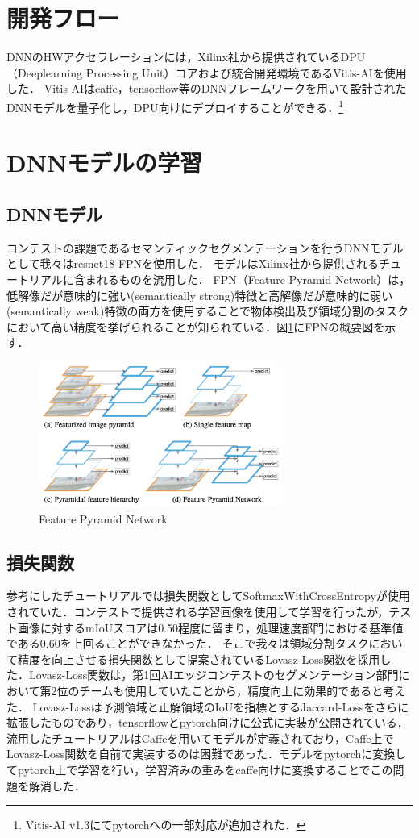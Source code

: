 \section{開発フロー}
DNNのHWアクセラレーションには，Xilinx社から提供されているDPU（Deeplearning Processing Unit）コア\cite{dpuip}および統合開発環境であるVitis-AIを使用した．
Vitis-AIはcaffe，tensorflow等のDNNフレームワークを用いて設計されたDNNモデルを量子化し，DPU向けにデプロイすることができる．\footnote{Vitis-AI v1.3にてpytorchへの一部対応が追加された．}
\section{DNNモデルの学習}
\subsection{DNNモデル}
コンテストの課題であるセマンティックセグメンテーションを行うDNNモデルとして我々はresnet18-FPNを使用した．
モデルはXilinx社から提供されるチュートリアル\cite{tutorial}に含まれるものを流用した．
FPN（Feature Pyramid Network）\cite{fpn}は，低解像だが意味的に強い(semantically strong)特徴と高解像だが意味的に弱い(semantically weak)特徴の両方を使用することで物体検出及び領域分割のタスクにおいて高い精度を挙げられることが知られている．図\ref{figure_fpn}にFPNの概要図を示す．
\begin{figure}[h]
    \begin{center}
        \includegraphics[width=8.0cm]{figures/fpn.png}
        \caption{Feature Pyramid Network\cite{fpn}}
        \label{figure_fpn}
        \end{center}
\end{figure}
\subsection{損失関数}
参考にしたチュートリアルでは損失関数としてSoftmaxWithCrossEntropyが使用されていた．コンテストで提供される学習画像を使用して学習を行ったが，テスト画像に対するmIoUスコアは0.50程度に留まり，処理速度部門における基準値である0.60を上回ることができなかった．
そこで我々は領域分割タスクにおいて精度を向上させる損失関数として提案されているLovasz-Loss関数\cite{lovasz}を採用した．Lovasz-Loss関数は，第1回AIエッジコンテストのセグメンテーション部門において第2位のチームも使用していたことから\cite{ref_signate_report}，精度向上に効果的であると考えた．
Lovasz-Lossは予測領域と正解領域のIoUを指標とするJaccard-Lossをさらに拡張したものであり，tensorflowとpytorch向けに公式に実装が公開されている．流用したチュートリアルはCaffeを用いてモデルが定義されており，Caffe上でLovasz-Loss関数を自前で実装するのは困難であった．モデルをpytorchに変換してpytorch上で学習を行い，学習済みの重みをcaffe向けに変換することでこの問題を解消した．
